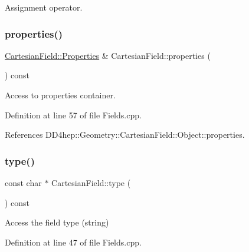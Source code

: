 Assignment operator. 

\hypertarget{class_d_d4hep_1_1_geometry_1_1_cartesian_field_a94ddb66bcec2bfea86149f574481a25a}{}\label{class_d_d4hep_1_1_geometry_1_1_cartesian_field_a94ddb66bcec2bfea86149f574481a25a} 
\subsubsection{\texorpdfstring{properties()}{properties()}}
{\footnotesize\ttfamily \hyperlink{class_d_d4hep_1_1_geometry_1_1_cartesian_field_a37a636b9f5ee9ead172cca958dacb920}{Cartesian\+Field\+::\+Properties} \& Cartesian\+Field\+::properties (\begin{DoxyParamCaption}{ }\end{DoxyParamCaption}) const}



Access to properties container. 



Definition at line 57 of file Fields.\+cpp.



References D\+D4hep\+::\+Geometry\+::\+Cartesian\+Field\+::\+Object\+::properties.

\hypertarget{class_d_d4hep_1_1_geometry_1_1_cartesian_field_ab54b47102de3afb97b9ea00a741932ea}{}\label{class_d_d4hep_1_1_geometry_1_1_cartesian_field_ab54b47102de3afb97b9ea00a741932ea} 
\subsubsection{\texorpdfstring{type()}{type()}}
{\footnotesize\ttfamily const char $\ast$ Cartesian\+Field\+::type (\begin{DoxyParamCaption}{ }\end{DoxyParamCaption}) const}



Access the field type (string) 



Definition at line 47 of file Fields.\+cpp.



